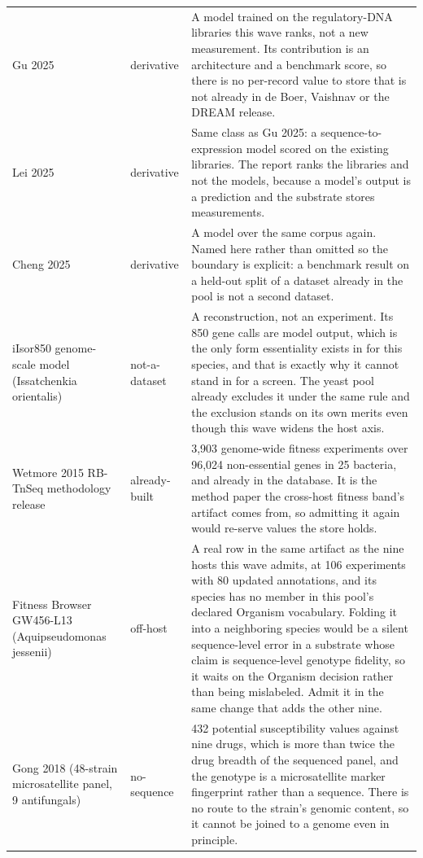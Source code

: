 \begin{longtable}{@{}L{58mm} L{26mm} L{88mm}@{}}
\addlinespace[5pt]
Gu 2025 & derivative & A model trained on the regulatory-DNA libraries this wave ranks, not a new measurement. Its contribution is an architecture and a benchmark score, so there is no per-record value to store that is not already in de Boer, Vaishnav or the DREAM release. \\
\addlinespace[5pt]
Lei 2025 & derivative & Same class as Gu 2025: a sequence-to-expression model scored on the existing libraries. The report ranks the libraries and not the models, because a model's output is a prediction and the substrate stores measurements. \\
\addlinespace[5pt]
Cheng 2025 & derivative & A model over the same corpus again. Named here rather than omitted so the boundary is explicit: a benchmark result on a held-out split of a dataset already in the pool is not a second dataset. \\
\addlinespace[5pt]
iIsor850 genome-scale model (Issatchenkia orientalis) & not-a-dataset & A reconstruction, not an experiment. Its 850 gene calls are model output, which is the only form essentiality exists in for this species, and that is exactly why it cannot stand in for a screen. The yeast pool already excludes it under the same rule and the exclusion stands on its own merits even though this wave widens the host axis. \\
\addlinespace[5pt]
Wetmore 2015 RB-TnSeq methodology release & already-built & 3,903 genome-wide fitness experiments over 96,024 non-essential genes in 25 bacteria, and already in the database. It is the method paper the cross-host fitness band's artifact comes from, so admitting it again would re-serve values the store holds. \\
\addlinespace[5pt]
Fitness Browser GW456-L13 (Aquipseudomonas jessenii) & off-host & A real row in the same artifact as the nine hosts this wave admits, at 106 experiments with 80 updated annotations, and its species has no member in this pool's declared Organism vocabulary. Folding it into a neighboring species would be a silent sequence-level error in a substrate whose claim is sequence-level genotype fidelity, so it waits on the Organism decision rather than being mislabeled. Admit it in the same change that adds the other nine. \\
\addlinespace[5pt]
Gong 2018 (48-strain microsatellite panel, 9 antifungals) & no-sequence & 432 potential susceptibility values against nine drugs, which is more than twice the drug breadth of the sequenced panel, and the genotype is a microsatellite marker fingerprint rather than a sequence. There is no route to the strain's genomic content, so it cannot be joined to a genome even in principle. \\

\end{longtable}
